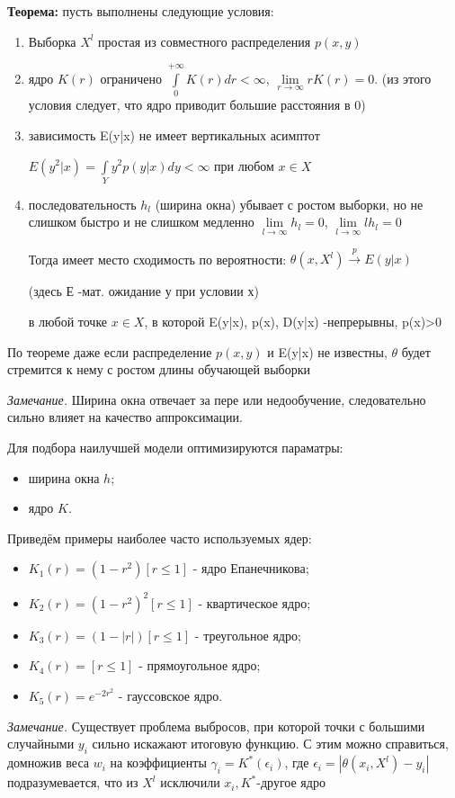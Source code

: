 \textbf{Теорема:}
пусть выполнены следующие условия:
\begin{enumerate}
    \item Выборка $X^l$ простая из совместного распределения $p(x,y)$
    \item ядро $K(r)$ ограничено $\displaystyle\int\limits_{0}^{+\infty} K(r)dr < \infty$,
    $\lim\limits_{r \to \infty}  rK(r) =0$.
    (из этого условия следует, что ядро приводит большие расстояния в 0)
    \item зависимость E(y|x) не имеет вертикальных асимптот

    $E(y^2|x)=\displaystyle\int\limits_{Y} y^2p(y|x)dy < \infty$ при любом $x \in X$
    \item последовательность $h_l$ (ширина окна) убывает с ростом выборки, но не слишком быстро и не слишком медленно
    $\lim\limits_{l\to \infty} h_l=0$,
    $\lim\limits_{l\to \infty} l h_l=0$

    Тогда имеет место сходимость по вероятности:
    $\theta(x, X^l) \xrightarrow{p}E(y|x) $

(здесь Е -мат. ожидание у при условии х)

    в любой точке $x \in X$, в которой E(y|x),  p(x), D(y|x) -непрерывны, p(x)>0
\end{enumerate}

По теореме даже если распределение $p(x,y)$ и E(y|x) не известны, $\theta$ будет стремится к нему с ростом длины обучающей выборки


\textit{Замечание.} Ширина окна отвечает за пере или недообучение,
следовательно сильно влияет на качество аппроксимации.



Для подбора наилучшей модели оптимизируются параматры:
\begin{itemize}
    \item ширина окна $h$;
    \item ядро $K$.
\end{itemize}

 Приведём примеры наиболее часто используемых ядер:
\begin{itemize}
    \item $\displaystyle K_1(r) = (1-r^2)[r\le1]$ - ядро Епанечникова;
    \item $\displaystyle K_2(r) = (1-r^2)^2[r\le1]$ - квартическое ядро;
    \item $\displaystyle K_3(r) = (1-|r|)[r\le1]$ - треугольное ядро;
    \item $\displaystyle K_4(r) = [r\le1]$ - прямоугольное ядро; \item $\displaystyle K_5(r) = e^{-2r^2}$ - гауссовское ядро.
\end{itemize}
\textit{Замечание.} Существует проблема выбросов, при которой точки с большими случайными $y_i$ сильно искажают итоговую функцию. С этим можно справиться, домножив веса $w_i$ на коэффициенты $\gamma_i = K^*(\epsilon_i)$, где $\epsilon_i =|\theta(x_i, X^l)-y_i|$ подразумевается, что из $X^l$ исключили $x_i, K^*$-другое ядро



